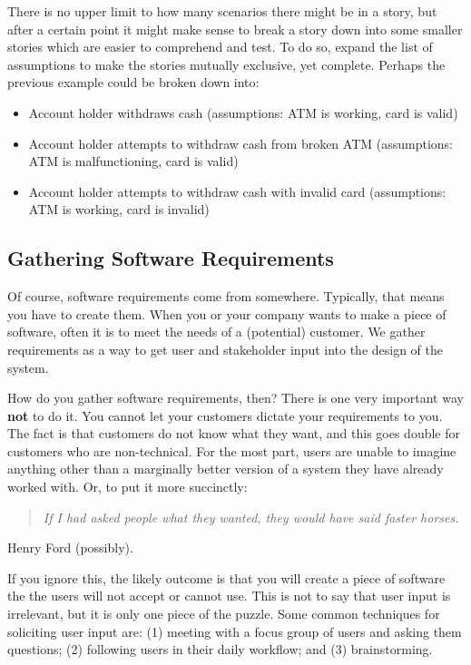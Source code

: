 There is no upper limit to how many scenarios there might be in a story, but after a certain point it might make sense to break a story down into some smaller stories which are easier to comprehend and test. To do so, expand the list of assumptions to make the stories mutually exclusive, yet complete. Perhaps the previous example could be broken down into:

\begin{itemize}
	\item Account holder withdraws cash (assumptions: ATM is working, card is valid)
	\item Account holder attempts to withdraw cash from broken ATM (assumptions: ATM is malfunctioning, card is valid)
	\item Account holder attempts to withdraw cash with invalid card (assumptions: ATM is working, card is invalid)
\end{itemize}


\subsection*{Gathering Software Requirements}

Of course, software requirements come from somewhere. Typically, that means you have to create them. When you or your company wants to make a piece of software, often it is to meet the needs of a (potential) customer. We gather requirements as a way to get user and stakeholder input into the design of the system.

How do you gather software requirements, then? There is one very important way \textbf{not} to do it. You cannot let your customers dictate your requirements to you. The fact is that customers do not know what they want, and this goes double for customers who are non-technical. For the most part, users are unable to imagine anything other than a marginally better version of a system they have already worked with. Or, to put it more succinctly:

\begin{quote}
	\textit{If I had asked people what they wanted, they would have said faster horses.}
\end{quote}
\vspace{-1.5em}
\hfill Henry Ford (possibly).

If you ignore this, the likely outcome is that you will create a piece of software the the users will not accept or cannot use. This is not to say that user input is irrelevant, but it is only one piece of the puzzle. Some common techniques for soliciting user input are: (1) meeting with a focus group of users and asking them questions; (2) following users in their daily workflow; and (3) brainstorming.


